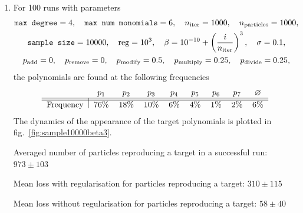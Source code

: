 \documentclass[11pt]{article}
\begin{document}
\begin{enumerate}
	  \item For 100 runs with parameters
		\begin{equation} \label{eq:sample10000beta3}
			\begin{gathered}
				\texttt{max degree} = 4, \quad \texttt{max num monomials} = 6, \quad n_{\rm iter} = 1000, \quad n_{\rm particles} = 1000, \\
				\texttt{sample size} = 10000, \quad {\rm reg} = 10^{3}, \quad \beta = 10^{-10} + \left(\frac{i}{n_{\rm iter}}\right)^{3}, \quad \sigma = 0.1, \\
				p_{\rm add} = 0, \quad p_{\rm remove} = 0, \quad p_{\rm modify} = 0.5, \quad p_{\rm multiply} = 0.25, \quad p_{\rm divide} = 0.25,
			\end{gathered}
		\end{equation}
		the polynomials are found at the following frequencies
	  \begin{equation}
	  	\begin{tabular}{l|cccccccc}
	  		& $p_{1}$ & $p_{2}$ & $p_{3}$ & $p_{4}$ & $p_{5}$ & $p_{6}$ & $p_{7}$ & $\varnothing$ \\\hline\hline
	  		Frequency & 76\% & 18\% & 10\% & 6\% & 4\% & 1\% & 2\% & 6\%
	  	\end{tabular}
	  \end{equation}
	  The dynamics of the appearance of the target polynomials is plotted in fig.~\ref{fig:sample10000beta3}.

	  Averaged number of particles reproducing a target in a successful run: $973 \pm 103$

	  Mean loss with regularisation for particles reproducing a target: $310 \pm 115$

	  Mean loss without regularisation for particles reproducing a target: $58 \pm 40$


\end{enumerate}
\end{document}
